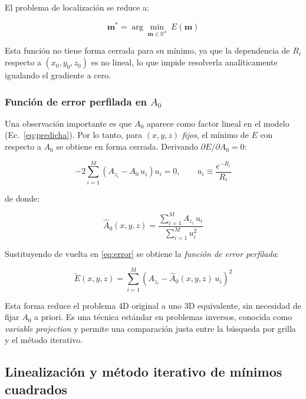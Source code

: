 \documentclass[12pt, a4paper]{article}
\begin{document}
El problema de localización se reduce a:

\begin{equation}
    \mathbf{m}^* = \arg\min_{\mathbf{m} \in \mathbb{R}^4}\; E(\mathbf{m})
    \label{eq:minimo}
\end{equation}

Esta función no tiene forma cerrada para su mínimo, ya que la
dependencia de $R_i$ respecto a $(x_0, y_0, z_0)$ es no lineal, lo
que impide resolverla analíticamente igualando el gradiente a cero.

\subsubsection*{Función de error perfilada en \texorpdfstring{$A_0$}{A0}}

Una observación importante es que $A_0$ aparece como factor lineal
en el modelo (Ec.~\ref{eq:predicha}). Por lo tanto, para
$(x,y,z)$ \emph{fijos}, el mínimo de $E$ con respecto a $A_0$ se
obtiene en forma cerrada. Derivando $\partial E/\partial A_0 = 0$:

\begin{equation}
    -2 \sum_{i=1}^{M} \left( A_{z_i} - A_0\,u_i\right) u_i = 0,
    \qquad u_i \equiv \frac{e^{-R_i}}{R_i}
\end{equation}

de donde:

\begin{equation}
    \widehat{A}_0(x, y, z) = \frac{\sum_{i=1}^M A_{z_i}\,u_i}{\sum_{i=1}^M u_i^2}
    \label{eq:A0_perfilado}
\end{equation}

Sustituyendo de vuelta en \eqref{eq:error} se obtiene la \emph{función
de error perfilada}:

\begin{equation}
    \widetilde{E}(x, y, z) =
    \sum_{i=1}^{M} \left( A_{z_i} - \widehat{A}_0(x,y,z)\,u_i \right)^2
    \label{eq:error_perfilado}
\end{equation}

Esta forma reduce el problema 4D original a uno 3D equivalente, sin
necesidad de fijar $A_0$ a priori. Es una técnica estándar en problemas
inversos, conocida como \emph{variable projection}
\cite{nocedal2006numerical} y permite una comparación justa entre la
búsqueda por grilla y el método iterativo.

\subsection{Linealización y método iterativo de mínimos cuadrados}
\end{document}

